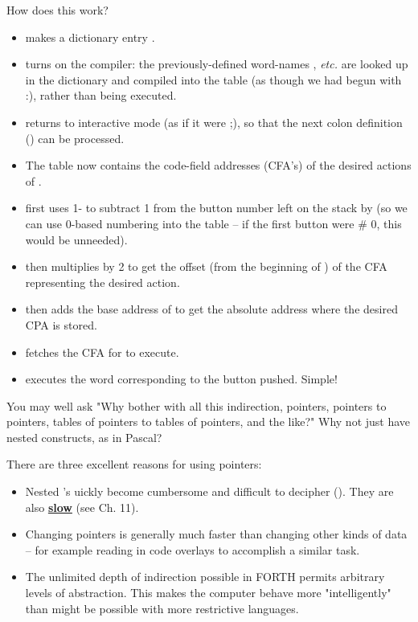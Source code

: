 How does this work?
\begin{itemize}
    \item {} makes a dictionary entry .
    \item \bc{]} turns on the compiler: the previously-defined word-names , \textit{etc.} are looked up in the dictionary and compiled into the table (as though we had begun with :), rather than being executed.
    \item \bc{[} returns to interactive mode (as if it were ;), so that the next colon definition () can be processed.
    \item The table  now contains the code-field addresses (CFA’s) of the desired actions of .
    \item {} first uses 1- to subtract 1 from the button number left on the stack by  (so we can use 0-based numbering into the table -- if the first button were \# 0, this would be unneeded).
    \item {} then multiplies by 2 to get the offset (from the beginning of ) of the CFA representing the desired action.
    \item {} then adds the base address of  to get the absolute address where the desired CPA is stored.
    \item {} fetches the CFA for  to execute.
    \item {} executes the word corresponding to the button pushed. Simple!
\end{itemize}

You may well ask "Why bother with all this indirection, pointers, pointers to pointers, tables of pointers to tables of pointers, and the like?" Why not just have nested  constructs, as in Pascal?

There are three excellent reasons for using pointers:
\begin{itemize}
    \item Nested 's uickly become cumbersome and difficult to decipher (\TF). They are also \underline{\textbf{slow}} (see Ch. 11).
    \item Changing pointers is generally much faster than changing other kinds of data -- for example reading in code overlays to accomplish a similar task.
    \item The unlimited depth of indirection possible in FORTH permits arbitrary levels of abstraction. This makes the computer behave more "intelligently" than might be possible with more restrictive languages.
\end{itemize}

